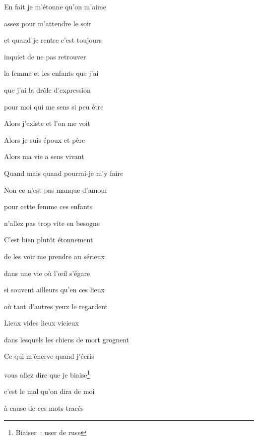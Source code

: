 	{

	\setlength{\parskip}{0pt}
	
	En fait je m'étonne qu'on m'aime

assez pour m'attendre le soir

et quand je rentre c'est toujours

inquiet de ne pas retrouver

la femme et les enfants que j'ai

que j'ai la drôle d'expression

pour moi qui me sens si peu être

Alors j'existe et l'on me voit

Alors je suis époux et père

Alors ma vie a sens vivant

Quand mais quand pourrai-je m'y faire

Non ce n'est pas manque d'amour

pour cette femme ces enfants

n'allez pas trop vite en besogne

C'est bien plutôt étonnement

de les voir me prendre au sérieux

dans une vie où l'œil s'égare

si souvent ailleurs qu'en ces lieux

où tant d'autres yeux le regardent

Lieux vides lieux vicieux

dans lesquels les chiens de mort grognent

Ce qui m'énerve quand j'écris

vous allez dire que je biaise\footnote{Biaiser~: user de ruse}

c'est le mal qu'on dira de moi

à cause de ces mots tracés

}
